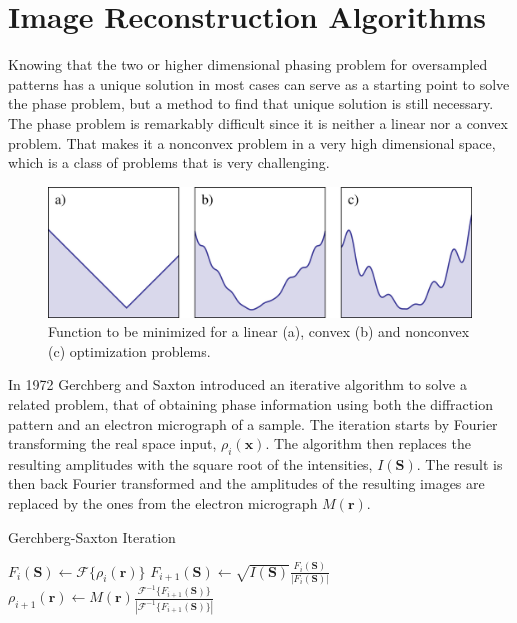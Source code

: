 \section{Image Reconstruction Algorithms}

Knowing that the two or higher dimensional phasing problem for oversampled
patterns has a unique solution in most cases can serve as a starting point to
solve the phase problem, but a method to find that unique solution is still
necessary. The phase problem is remarkably difficult since it is neither a
linear nor a convex problem. That makes it a nonconvex problem in a very high
dimensional space, which is a class of problems that is very challenging.

\begin{figure}[h]
  \centering
  \includegraphics[width=1 \columnwidth]{Image_Reconstruction/convexity.png}
  \caption{Function to be minimized for a linear (a), convex (b) and nonconvex
    (c) optimization problems.}
  \label{Fig:Convexity}
\end{figure}

In 1972 Gerchberg and Saxton \cite{Gerchberg1972Practical} introduced an iterative algorithm to solve
a related problem, that of obtaining phase information using both the
diffraction pattern and an electron micrograph of a sample. The iteration starts
by Fourier transforming the real space input, $\rho_i(\mathbf x)$. The algorithm
then replaces the resulting amplitudes with the square root of the intensities,
$I(\mathbf S)$. The result is then back Fourier transformed and the amplitudes
of the resulting images are replaced by the ones from the electron micrograph $M(\mathbf r)$.
\begin{algorithm}
\caption{Gerchberg-Saxton Iteration}
\begin{algorithmic}
  \STATE $F_{i}(\mathbf S) \gets \mathscr{F}\{\rho_i(\mathbf r)\}$
  \STATE $F_{i+1}(\mathbf S) \gets \sqrt{I(\mathbf S)} \frac{F_i(\mathbf S)}{|F_i(\mathbf S)|}$
  \STATE $\rho_{i+1}(\mathbf r) \gets M(\mathbf r)
  \frac{\mathscr{F}^{-1}\{F_{i+1}(\mathbf
    S)\}}{|\mathscr{F}^{-1}\{F_{i+1}(\mathbf S)\}|}$
\end{algorithmic}
\end{algorithm}

